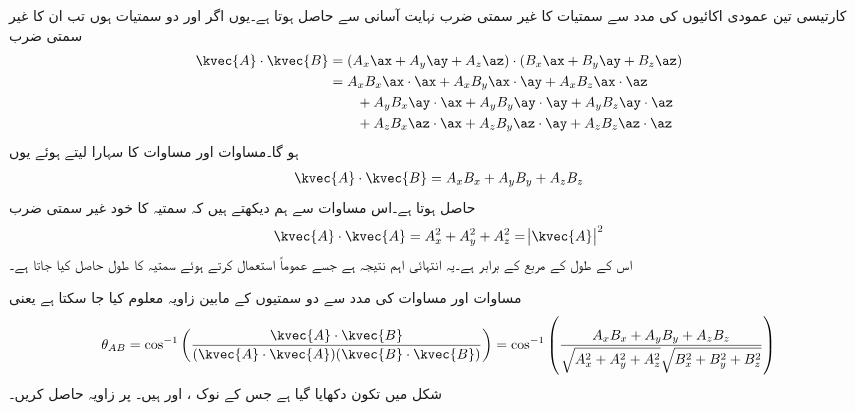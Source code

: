 کارتیسی تین عمودی اکائیوں کی مدد سے سمتیات کا غیر سمتی ضرب نہایت آسانی سے حاصل ہوتا ہے۔یوں اگر  اور    دو سمتیات ہوں تب ان کا غیر سمتی ضرب
\begin{align*}
\kvec{A} \cdot \kvec{B}&=(A_x\ax+A_y\ay+A_z\az) \cdot (B_x\ax+B_y\ay+B_z\az)\\
&=A_x B_x \ax \cdot \ax+A_x B_y \ax \cdot \ay+A_x B_z \ax \cdot \az\\
& \quad \quad +A_y B_x \ay \cdot \ax+A_y B_y \ay \cdot \ay+A_y B_z \ay \cdot \az \\
&\quad \quad +A_z B_x \az \cdot \ax+A_z B_y \az \cdot \ay+A_z B_z \az \cdot \az
\end{align*}
ہو گا۔مساوات  اور مساوات  کا سہارا لیتے ہوئے یوں
\begin{align}\label{مساوات_سمتیہ_نقطہ_ضرب_ با_مدد_اکائی_سمتیات}
\kvec{A} \cdot \kvec{B}=A_x B_x+A_y B_y+ A_z B_z
\end{align}
حاصل ہوتا ہے۔اس مساوات سے ہم دیکھتے ہیں کہ سمتیہ  کا خود غیر سمتی ضرب 
\begin{align}
\kvec{A} \cdot \kvec{A} =A_x^2+A_y^2+ A_z^2=\abs{\kvec{A}}^2
\end{align}
اس کے طول کے مربع کے برابر ہے۔یہ انتہائی اہم نتیجہ ہے جسے عموماً استعمال کرتے ہوئے سمتیہ کا طول حاصل کیا جاتا ہے۔

مساوات  اور مساوات  کی مدد سے دو سمتیوں کے مابین زاویہ معلوم کیا جا سکتا ہے یعنی
\begin{align}
\theta_{AB}=\cos^{-1}\left(\frac{\kvec{A} \cdot \kvec{B}}{(\kvec{A} \cdot \kvec{A})(\kvec{B} \cdot \kvec{B})}\right)=\cos^{-1} \left(\frac{A_x B_x+A_y B_y+ A_z B_z}{\sqrt{A_x^2+A_y^2+A_z^2} \sqrt{B_x^2+B_y^2+B_z^2}} \right)
\end{align}
شکل  میں تکون دکھایا گیا ہے جس کے نوک  ،  اور   ہیں۔ پر زاویہ حاصل کریں۔

